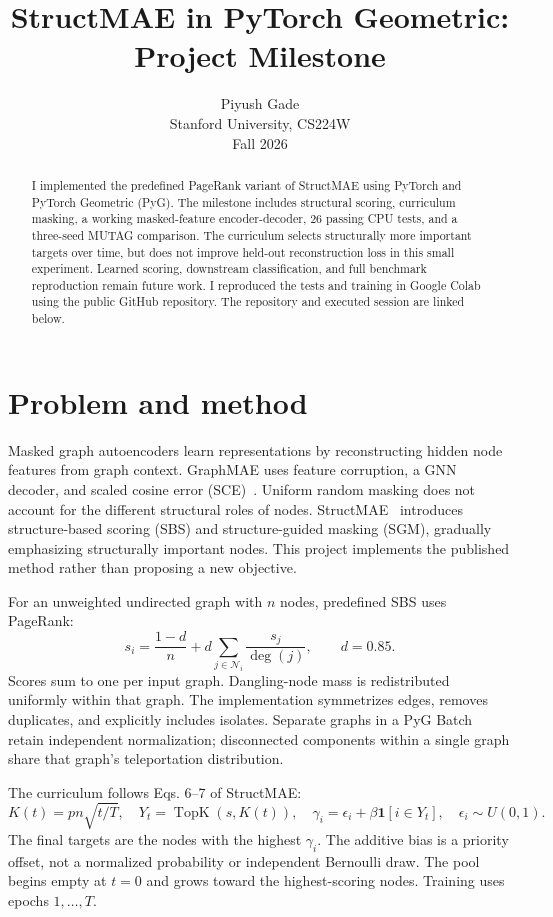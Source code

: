 \documentclass{article}
\title{StructMAE in PyTorch Geometric: Project Milestone}
\author{Piyush Gade\\Stanford University, CS224W\\Fall 2026}
\begin{document}
\maketitle
\begin{abstract}
I implemented the predefined PageRank variant of StructMAE using PyTorch and PyTorch Geometric (PyG). The milestone includes structural scoring, curriculum masking, a working masked-feature encoder-decoder, 26 passing CPU tests, and a three-seed MUTAG comparison. The curriculum selects structurally more important targets over time, but does not improve held-out reconstruction loss in this small experiment. Learned scoring, downstream classification, and full benchmark reproduction remain future work. I reproduced the tests and training in Google Colab using the public GitHub repository. The repository and executed session are linked below.
\end{abstract}

\section{Problem and method}
Masked graph autoencoders learn representations by reconstructing hidden node features from graph context. GraphMAE uses feature corruption, a GNN decoder, and scaled cosine error (SCE)~\cite{graphmae}. Uniform random masking does not account for the different structural roles of nodes. StructMAE~\cite{structmae} introduces structure-based scoring (SBS) and structure-guided masking (SGM), gradually emphasizing structurally important nodes. This project implements the published method rather than proposing a new objective.

For an unweighted undirected graph with $n$ nodes, predefined SBS uses PageRank:
\begin{equation}
s_i=\frac{1-d}{n}+d\sum_{j\in\mathcal N_i}\frac{s_j}{\deg(j)},\qquad d=0.85.
\end{equation}
Scores sum to one per input graph. Dangling-node mass is redistributed uniformly within that graph. The implementation symmetrizes edges, removes duplicates, and explicitly includes isolates. Separate graphs in a PyG Batch retain independent normalization; disconnected components within a single graph share that graph's teleportation distribution.

The curriculum follows Eqs. 6--7 of StructMAE:
\begin{equation}
K(t)=pn\sqrt{t/T},\quad Y_t=\operatorname{TopK}(s,K(t)),\quad
\gamma_i=\epsilon_i+\beta\mathbf{1}[i\in Y_t],\quad \epsilon_i\sim U(0,1).
\end{equation}
The final targets are the nodes with the highest $\gamma_i$. The additive bias is a priority offset, not a normalized probability or independent Bernoulli draw. The pool begins empty at $t=0$ and grows toward the highest-scoring nodes. Training uses epochs $1,\ldots,T$.
\end{document}
